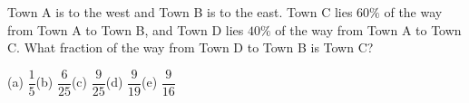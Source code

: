 Town A is to the west and Town B is to the east. Town C lies $60\%$ of the way from Town A to Town B, and Town D lies $40\%$ of the way from Town A to Town C. What fraction of the way from Town D to Town B is Town C?

(a) $\dfrac{1}{5}$\quad (b) $\dfrac{6}{25}$\quad (c) $\dfrac{9}{25}$\quad (d) $\dfrac{9}{19}$\quad (e) $\dfrac{9}{16}$
